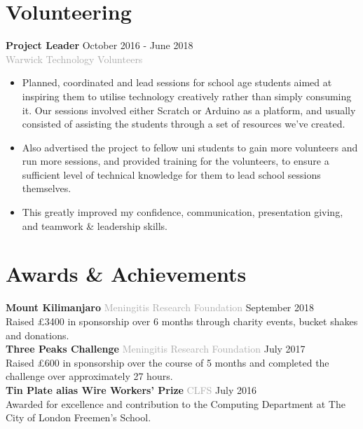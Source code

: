 \documentclass[11pt]{article}
\newcommand{\dash}{\item[-]}
\begin{document}
  \section*{Volunteering}
\textbf{Project Leader} \hfill October 2016 - June 2018 \\
\textcolor{darkgray}{Warwick Technology Volunteers}
   \begin{itemize}
    \dash Planned, coordinated and lead sessions for school age students aimed at inspiring them to utilise technology creatively rather than simply consuming it. Our sessions involved either Scratch or Arduino as a platform, and usually consisted of assisting the students through a set of resources we’ve created.
	\dash Also advertised the project to fellow uni students to gain more volunteers and run more sessions, and provided training for the volunteers, to ensure a sufficient level of technical knowledge for them to lead school sessions themselves.
	\dash This greatly improved my confidence, communication, presentation giving, and teamwork \& leadership skills.
   \end{itemize}

  \section*{Awards \& Achievements}
\textbf{Mount Kilimanjaro} \hfill \hspace{4em} \textcolor{darkgray}{Meningitis Research Foundation} \hfill September 2018 \\
\hspace*{2em} Raised £3400 in sponsorship over 6 months through charity events, bucket shakes and  donations.
\vspace{1ex}\\
\textbf{Three Peaks Challenge} \hfill \textcolor{darkgray}{Meningitis Research Foundation} \hfill July 2017 \\
\hspace*{2em} Raised £600 in sponsorship over the course of 5 months and completed the challenge over approximately 27 hours.
\vspace{1ex}\\
\textbf{Tin Plate alias Wire Workers’ Prize} \hfill \hspace{-17em} \textcolor{darkgray}{CLFS} \hfill July 2016 \\
\hspace*{2em} Awarded for excellence and contribution to the Computing Department at The City of London Freemen’s School.
\end{document}

